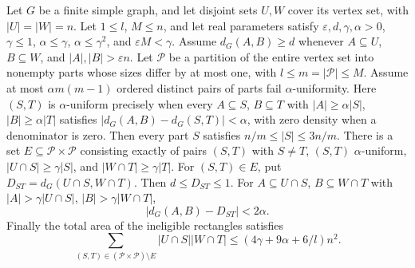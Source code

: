 \begin{lemma}
Let $G$ be a finite simple graph, and let disjoint sets $U,W$ cover its
vertex set, with $|U|=|W|=n$. Let $1\leq l$, $M\leq n$, and let real
parameters satisfy $\varepsilon,d,\gamma,\alpha>0$, $\gamma\leq1$,
$\alpha\leq\gamma$, $\alpha\leq\gamma^2$, and
$\varepsilon M<\gamma$. Assume $d_G(A,B)\geq d$ whenever
$A\subseteq U$, $B\subseteq W$, and $|A|,|B|>\varepsilon n$.
Let $\mathcal P$ be a partition of the entire vertex set into nonempty
parts whose sizes differ by at most one, with
$l\leq m=|\mathcal P|\leq M$. Assume at most $\alpha m(m-1)$ ordered
distinct pairs of parts fail $\alpha$-uniformity. Here $(S,T)$ is
$\alpha$-uniform precisely when every $A\subseteq S$, $B\subseteq T$
with $|A|\geq\alpha|S|$, $|B|\geq\alpha|T|$ satisfies
$|d_G(A,B)-d_G(S,T)|<\alpha$, with zero density when a denominator
is zero.
Then every part $S$ satisfies $n/m\leq|S|\leq3n/m$.
There is a set $E\subseteq\mathcal P\times\mathcal P$ consisting
exactly of pairs $(S,T)$ with $S\ne T$, $(S,T)$ $\alpha$-uniform,
$|U\cap S|\geq\gamma|S|$, and $|W\cap T|\geq\gamma|T|$.
For $(S,T)\in E$, put $D_{ST}=d_G(U\cap S,W\cap T)$. Then
$d\leq D_{ST}\leq1$. For $A\subseteq U\cap S$, $B\subseteq W\cap T$
with $|A|>\gamma|U\cap S|$, $|B|>\gamma|W\cap T|$,
\[
 |d_G(A,B)-D_{ST}|<2\alpha.
\]
Finally the total area of the ineligible rectangles satisfies
\[
 \sum_{(S,T)\in(\mathcal P\times\mathcal P)\setminus E}
       |U\cap S||W\cap T|
 \leq (4\gamma+9\alpha+6/l)n^2.
\]
\end{lemma}
